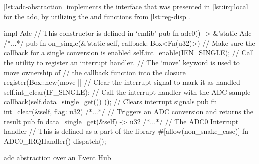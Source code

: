 \autoref{lst:adc-abstraction} implements the interface that was presented in \autoref{lst:irq:local} for the \gls{adc}, by utilizing the  and  functions from \autoref{lst:reg-disp}.


\begin{listing}[H]
  \begin{rustcode}
impl Adc {
  // This constructor is defined in `emlib'
  pub fn adc0() -> &'static Adc { /*...*/ }
  pub fn on_single(&'static self, callback: Box<Fn(u32)>) {
    // Make sure the callback for a single conversion is enabled
    self.int_enable(IEN_SINGLE);
    // Call the utility to register an interrupt handler.
    // The `move' keyword is used to move ownership of
    // the callback function into the closure
    register(Box::new(move || {
      // Clear the interrupt signal to mark it as handled
      self.int_clear(IF_SINGLE);
      // Call the interrupt handler with the ADC sample
      callback(self.data_single_get())
    }));
  }
  // Clears interrupt signals
  pub fn int_clear(&self, flag: u32) { /*...*/ }
  // Triggers an ADC conversion and returns the result
  pub fn data_single_get(&self) -> u32 { /*...*/ }
}
// The ADC0 Interrupt handler
// This is defined as a part of the library
#[allow(non_snake_case)]
fn ADC0_IRQHandler() {
  dispatch();
}
  \end{rustcode}
  \caption{\gls{adc} abstraction over an Event Hub}
  \label{lst:adc-abstraction}
\end{listing}




